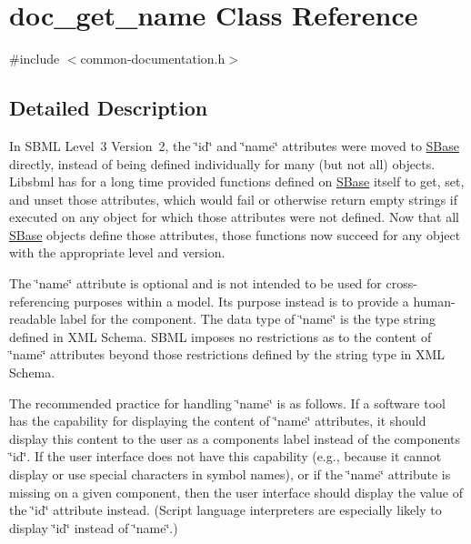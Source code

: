 \hypertarget{classdoc__get__name}{}\section{doc\+\_\+get\+\_\+name Class Reference}
\label{classdoc__get__name}


{\ttfamily \#include $<$common-\/documentation.\+h$>$}



\subsection{Detailed Description}
\begin{DoxyParagraph}{}
In S\+B\+ML Level~3 Version~2, the \char`\"{}id\char`\"{} and \char`\"{}name\char`\"{} attributes were moved to \hyperlink{class_s_base}{S\+Base} directly, instead of being defined individually for many (but not all) objects. Libsbml has for a long time provided functions defined on \hyperlink{class_s_base}{S\+Base} itself to get, set, and unset those attributes, which would fail or otherwise return empty strings if executed on any object for which those attributes were not defined. Now that all \hyperlink{class_s_base}{S\+Base} objects define those attributes, those functions now succeed for any object with the appropriate level and version.
\end{DoxyParagraph}
The \char`\"{}name\char`\"{} attribute is optional and is not intended to be used for cross-\/referencing purposes within a model. Its purpose instead is to provide a human-\/readable label for the component. The data type of \char`\"{}name\char`\"{} is the type {\ttfamily string} defined in X\+ML Schema. S\+B\+ML imposes no restrictions as to the content of \char`\"{}name\char`\"{} attributes beyond those restrictions defined by the {\ttfamily string} type in X\+ML Schema.

The recommended practice for handling \char`\"{}name\char`\"{} is as follows. If a software tool has the capability for displaying the content of \char`\"{}name\char`\"{} attributes, it should display this content to the user as a component\textquotesingle{}s label instead of the component\textquotesingle{}s \char`\"{}id\char`\"{}. If the user interface does not have this capability (e.\+g., because it cannot display or use special characters in symbol names), or if the \char`\"{}name\char`\"{} attribute is missing on a given component, then the user interface should display the value of the \char`\"{}id\char`\"{} attribute instead. (Script language interpreters are especially likely to display \char`\"{}id\char`\"{} instead of \char`\"{}name\char`\"{}.)

